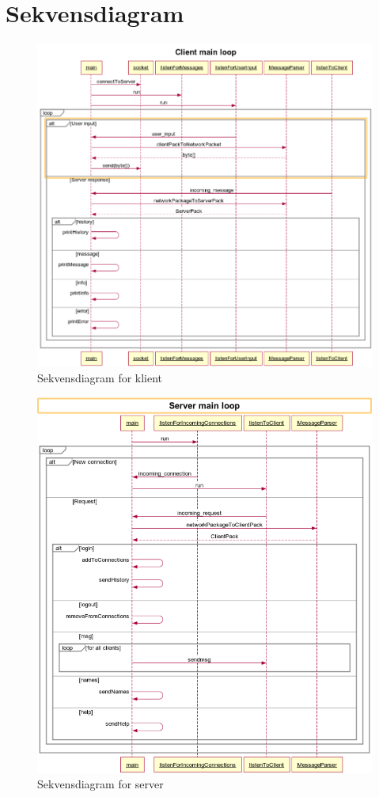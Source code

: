 \documentclass[12pt,a4paper]{article}
\begin{document}
\section{Sekvensdiagram}
\begin{figure}[H]
    \centering
    \includegraphics[width=\textwidth]{sequence_client_main.png}
    \caption{Sekvensdiagram for klient}
    \label{seq_client}
\end{figure}

\begin{figure}[H]
    \centering
    \includegraphics[width=\textwidth]{sequence_server_main.png}
    \caption{Sekvensdiagram for server}
    \label{seq_server}
\end{figure}
\end{document}
